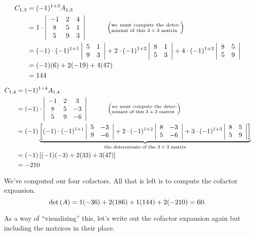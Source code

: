 {\begin{align*}C_{1,3} &= (-1)^{1+3}\tta_{1,3}\\
	&= 1\cdot\bdt{ccc}-1&2&4\\8&5&1\\5&9&3\edt \quad\quad\quad \left(\parbox{100pt}{\scriptsize we must compute the determinant of this $3\times 3$ matrix}\right)\\
	&= (-1)\cdot(-1)^{1+1}\bdt{cc}5&1\\9&3\edt + 2\cdot(-1)^{1+2}\bdt{cc}8&1\\5&3\edt + 4\cdot(-1)^{1+3}\bdt{cc}8&5\\5&9\edt \\
	&= (-1)(6)+2(-19)+4(47)\\
	&= 144
\end{align*}

\begin{align*}C_{1,4} &= (-1)^{1+4}\tta_{1,4}\\
	&= (-1)\cdot\bdt{ccc}-1&2&3\\8&5&-3\\5&9&-6\edt \quad\quad\quad \left(\parbox{100pt}{\scriptsize we must compute the determinant of this $3\times 3$ matrix}\right)\\
	&= (-1)\underbrace{\left[(-1)\cdot(-1)^{1+1}\bdt{cc}5&-3\\9&-6\edt + 2\cdot(-1)^{1+2}\bdt{cc}8&-3\\5&-6\edt + 3\cdot(-1)^{1+3}\bdt{cc}8&5\\5&9\edt\right]}_{\parbox{150pt}{\centering\scriptsize the determinate of the $3 \times 3$ matrix}} \\
	&= (-1)\left[(-1)(-3)+2(33)+3(47)\right]\\
	&= -210
\end{align*}

We've computed our four cofactors. All that is left is to compute the cofactor expansion.
$$\text{det}\left(A\right) = 1(-36) + 2(186)+1(144)+2(-210) = 60.$$

As a way of ``visualizing'' this, let's write out the cofactor expansion again but including the matrices in their place. 

}
